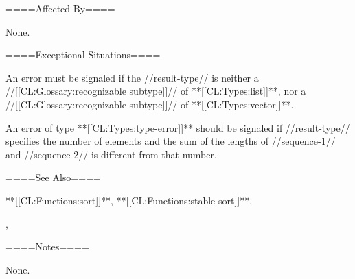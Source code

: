 ====Affected By====

None.

====Exceptional Situations====

An error must be signaled if the //result-type// is neither a //[[CL:Glossary:recognizable subtype]]// of **[[CL:Types:list]]**, nor a //[[CL:Glossary:recognizable subtype]]// of **[[CL:Types:vector]]**.

An error of type **[[CL:Types:type-error]]** should be signaled if //result-type// specifies the number of elements and the sum of the lengths of //sequence-1// and //sequence-2// is different from that number.

====See Also====

**[[CL:Functions:sort]]**, **[[CL:Functions:stable-sort]]**,

{\secref\ConstantModification},

{\secref\TraversalRules}

====Notes====

None.

      
